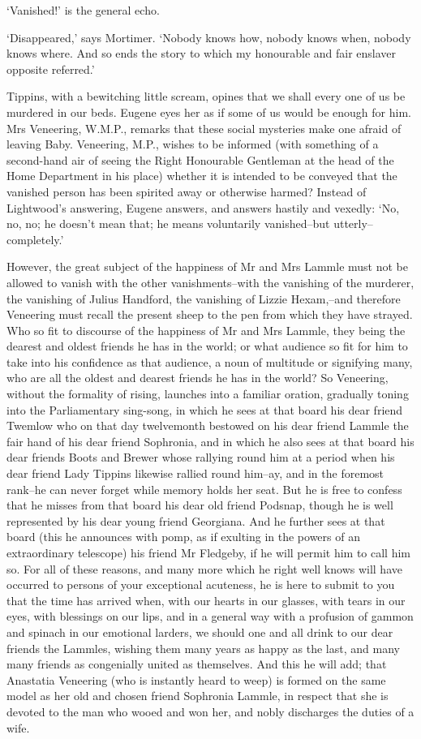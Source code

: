 ‘Vanished!’ is the general echo.

‘Disappeared,’ says Mortimer. ‘Nobody knows how, nobody knows when,
nobody knows where. And so ends the story to which my honourable and
fair enslaver opposite referred.’

Tippins, with a bewitching little scream, opines that we shall every one
of us be murdered in our beds. Eugene eyes her as if some of us would
be enough for him. Mrs Veneering, W.M.P., remarks that these social
mysteries make one afraid of leaving Baby. Veneering, M.P., wishes to
be informed (with something of a second-hand air of seeing the Right
Honourable Gentleman at the head of the Home Department in his place)
whether it is intended to be conveyed that the vanished person has been
spirited away or otherwise harmed? Instead of Lightwood’s answering,
Eugene answers, and answers hastily and vexedly: ‘No, no, no; he doesn’t
mean that; he means voluntarily vanished--but utterly--completely.’

However, the great subject of the happiness of Mr and Mrs Lammle must
not be allowed to vanish with the other vanishments--with the vanishing
of the murderer, the vanishing of Julius Handford, the vanishing of
Lizzie Hexam,--and therefore Veneering must recall the present sheep
to the pen from which they have strayed. Who so fit to discourse of
the happiness of Mr and Mrs Lammle, they being the dearest and oldest
friends he has in the world; or what audience so fit for him to take
into his confidence as that audience, a noun of multitude or signifying
many, who are all the oldest and dearest friends he has in the world?
So Veneering, without the formality of rising, launches into a familiar
oration, gradually toning into the Parliamentary sing-song, in which he
sees at that board his dear friend Twemlow who on that day twelvemonth
bestowed on his dear friend Lammle the fair hand of his dear friend
Sophronia, and in which he also sees at that board his dear friends
Boots and Brewer whose rallying round him at a period when his dear
friend Lady Tippins likewise rallied round him--ay, and in the foremost
rank--he can never forget while memory holds her seat. But he is free
to confess that he misses from that board his dear old friend Podsnap,
though he is well represented by his dear young friend Georgiana. And he
further sees at that board (this he announces with pomp, as if exulting
in the powers of an extraordinary telescope) his friend Mr Fledgeby, if
he will permit him to call him so. For all of these reasons, and many
more which he right well knows will have occurred to persons of your
exceptional acuteness, he is here to submit to you that the time has
arrived when, with our hearts in our glasses, with tears in our eyes,
with blessings on our lips, and in a general way with a profusion of
gammon and spinach in our emotional larders, we should one and all drink
to our dear friends the Lammles, wishing them many years as happy as
the last, and many many friends as congenially united as themselves. And
this he will add; that Anastatia Veneering (who is instantly heard to
weep) is formed on the same model as her old and chosen friend Sophronia
Lammle, in respect that she is devoted to the man who wooed and won her,
and nobly discharges the duties of a wife.

